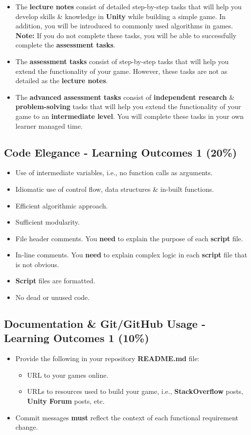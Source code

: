 \documentclass{article}
\begin{document}
\begin{itemize}
	\begin{itemize}
		\item The \textbf{lecture notes} consist of detailed step-by-step tasks that will help you develop skills \& knowledge in \textbf{Unity} while building a simple game. In addition, you will be introduced to commonly used algorithms in games. \textbf{Note:} If you do not complete these tasks, you will be able to successfully complete the \textbf{assessment tasks}. 
		\item The \textbf{assessment tasks} consist of step-by-step tasks that will help you extend the functionality of your game. However, these tasks are not as detailed as the \textbf{lecture notes}.
		\item The \textbf{advanced assessment tasks} consist of \textbf{independent research} \& \textbf{problem-solving} tasks that will help you extend the functionality of your game to an \textbf{intermediate level}. You will complete these tasks in your own learner managed time.
	\end{itemize} 
\end{itemize}

\subsection*{Code Elegance - Learning Outcomes 1 (20\%)}
\begin{itemize}
	\item Use of intermediate variables, i.e., no function calls as arguments.
	\item Idiomatic use of control flow, data structures \& in-built functions.
	\item Efficient algorithmic approach.
	\item Sufficient modularity. 
	\item File header comments. You \textbf{need} to explain the purpose of each \textbf{script} file.
	\item In-line comments. You \textbf{need} to explain complex logic in each \textbf{script} file that is not obvious.
	\item \textbf{Script} files are formatted.
	\item No dead or unused code.
\end{itemize}

\subsection*{Documentation \& Git/GitHub Usage - Learning Outcomes 1 (10\%)}
\begin{itemize}
	\item Provide the following in your repository \textbf{README.md} file:
	      \begin{itemize}
		      \item URL to your games online.
		      \item URLs to resources used to build your game, i.e., \textbf{StackOverflow} posts, \textbf{Unity Forum} posts, etc.
	      \end{itemize}
	\item Commit messages \textbf{must} reflect the context of each functional requirement change.
\end{itemize}
\end{document}
